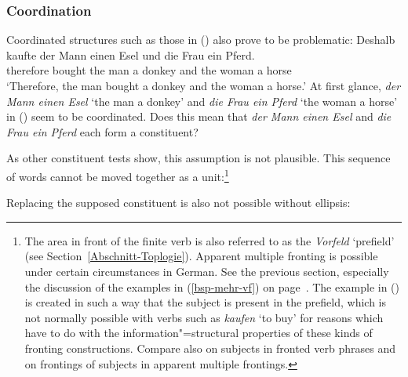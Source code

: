 \subsubsection{Coordination}
\label{Abschnitt-K-Tests-Koordination}

Coordinated structures such as those in () also prove to be problematic:
\ea
\label{ex-gapping}
\gll Deshalb kaufte der Mann einen Esel und die Frau ein Pferd.\\
	 therefore bought the man a donkey and the woman a horse\\
\glt `Therefore, the man bought a donkey and the woman a horse.'
\z
At first glance, \emph{der Mann einen Esel} `the man a donkey' and \emph{die Frau ein Pferd} `the woman a horse' in () seem to be coordinated.
Does this mean that \emph{der Mann einen Esel} and \emph{die Frau ein Pferd} each form a constituent?

As other constituent tests show, this assumption is not plausible. This sequence of words cannot be moved together as a unit:\footnote{%
	The area in front of the finite verb is also referred to as the \emph{Vorfeld}
        `prefield' (see Section~\ref{Abschnitt-Toplogie}).
	Apparent multiple fronting is possible under certain circumstances in German. See the previous section, especially the discussion of the examples
	in (\ref{bsp-mehr-vf}) on page~\pageref{bsp-mehr-vf}. The example in () is created in such a way that the subject is present in the prefield,
	which is not normally possible with verbs such as \emph{kaufen} `to buy' for reasons which have to do with the information"=structural properties of these
	kinds of fronting constructions. Compare also \citealp{dKM2003a} on subjects in fronted verb
        phrases and \citealp[]{BC2010a} on frontings of subjects in apparent multiple frontings.
}
\z

\noindent
Replacing the supposed constituent is also not possible without ellipsis:

